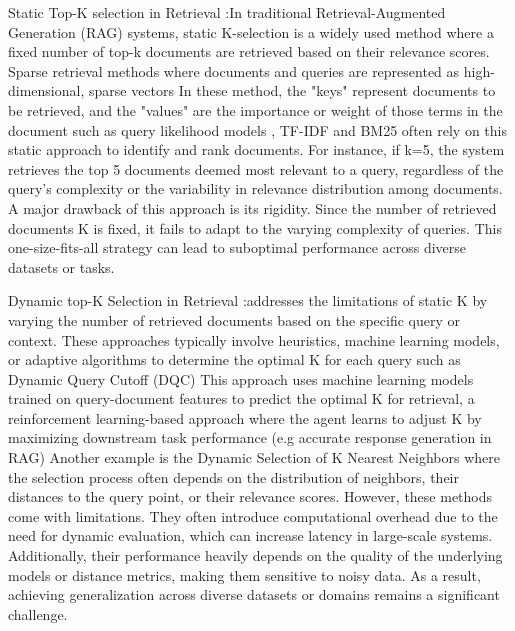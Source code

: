 \documentclass[Afour,sageh,times]{sagej}
\begin{document}
Static Top-K selection in Retrieval :In traditional Retrieval-Augmented Generation (RAG) systems, static K-selection is a widely used method where a fixed number of top-k documents are retrieved based on their relevance scores. Sparse retrieval \cite{bai2020spartermlearningtermbasedsparse} methods where documents and queries are represented as high-dimensional, sparse vectors In these method, the "keys" represent documents to be retrieved, and the "values" are the importance or weight of those terms in the document such as query likelihood models \cite{Lafferty2001}, TF-IDF \cite{Robertson1997} and BM25 \cite{Zaragoza2009} often rely on this static approach to identify and rank documents. For instance, if k=5, the system retrieves the top 5 documents deemed most relevant to a query, regardless of the query's complexity or the variability in relevance distribution among documents.
A major drawback of this approach is its rigidity. Since the number of retrieved documents K is fixed, it fails to adapt to the varying complexity of queries. This one-size-fits-all strategy can lead to suboptimal performance across diverse datasets or tasks.


Dynamic top-K Selection in Retrieval :addresses the limitations of static K by varying the number of retrieved documents based on the specific query or context. These approaches typically involve heuristics, machine learning models, or adaptive algorithms to determine the optimal K for each query such as Dynamic Query Cutoff (DQC) \cite{Culpepper2016} This approach uses machine learning models trained on query-document features to predict the optimal K for retrieval, a reinforcement learning-based approach \cite{Zhou2021} where the agent learns to adjust K by maximizing downstream task performance (e.g accurate response generation in RAG) Another example is the Dynamic Selection of K Nearest Neighbors \cite{DynamicKNN2012} where the selection process often depends on the distribution of neighbors, their distances to the query point, or their relevance scores.
However, these methods come with limitations. They often introduce computational overhead due to the need for dynamic evaluation, which can increase latency in large-scale systems. Additionally, their performance heavily depends on the quality of the underlying models or distance metrics, making them sensitive to noisy data. As a result, achieving generalization across diverse datasets or domains remains a significant challenge.
\end{document}

